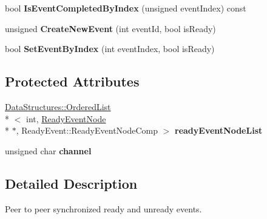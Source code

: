 \begin{DoxyCompactItemize}
\item 
\hypertarget{class_rak_net_1_1_ready_event_a4157333874e9cf0b038edf5165fc9e35}{bool {\bfseries Is\-Event\-Completed\-By\-Index} (unsigned event\-Index) const }\label{class_rak_net_1_1_ready_event_a4157333874e9cf0b038edf5165fc9e35}

\item 
\hypertarget{class_rak_net_1_1_ready_event_a5e280fe9ba2c8791783afc659b9c4157}{unsigned {\bfseries Create\-New\-Event} (int event\-Id, bool is\-Ready)}\label{class_rak_net_1_1_ready_event_a5e280fe9ba2c8791783afc659b9c4157}

\item 
\hypertarget{class_rak_net_1_1_ready_event_ab19cca26204561a893ed03a6671c8d50}{bool {\bfseries Set\-Event\-By\-Index} (int event\-Index, bool is\-Ready)}\label{class_rak_net_1_1_ready_event_ab19cca26204561a893ed03a6671c8d50}

\end{DoxyCompactItemize}
\subsection*{Protected Attributes}
\begin{DoxyCompactItemize}
\item 
\hypertarget{class_rak_net_1_1_ready_event_adc22ed2c55d19dfd7c2dfccf5e6323bf}{\hyperlink{class_data_structures_1_1_ordered_list}{Data\-Structures\-::\-Ordered\-List}\\*
$<$ int, \hyperlink{struct_rak_net_1_1_ready_event_1_1_ready_event_node}{Ready\-Event\-Node} \\*
$\ast$, Ready\-Event\-::\-Ready\-Event\-Node\-Comp $>$ {\bfseries ready\-Event\-Node\-List}}\label{class_rak_net_1_1_ready_event_adc22ed2c55d19dfd7c2dfccf5e6323bf}

\item 
\hypertarget{class_rak_net_1_1_ready_event_a751025b4ae2d3138e349426bc71d37e7}{unsigned char {\bfseries channel}}\label{class_rak_net_1_1_ready_event_a751025b4ae2d3138e349426bc71d37e7}

\end{DoxyCompactItemize}


\subsection{Detailed Description}
Peer to peer synchronized ready and unready events. 

